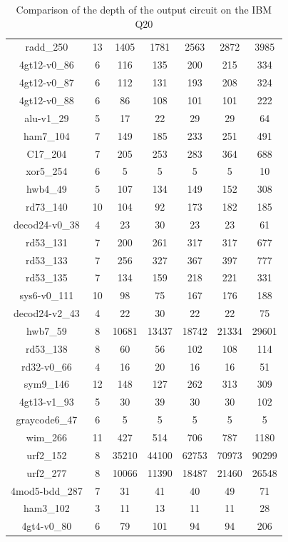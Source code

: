 \documentclass[runningheads]{llncs}
\begin{document}
\begin{table}[H]
\begin{center}
\begin{tabular}{|c|c|c|c|c|c|c|}
radd\_250 & 13 & 1405 & 1781 & 2563 & 2872 & 3985 \\
4gt12-v0\_86 & 6 & 116 & 135 & 200 & 215 & 334 \\
4gt12-v0\_87 & 6 & 112 & 131 & 193 & 208 & 324 \\
4gt12-v0\_88 & 6 & 86 & 108 & 101 & 101 & 222 \\
alu-v1\_29 & 5 & 17 & 22 & 29 & 29 & 64 \\
ham7\_104 & 7 & 149 & 185 & 233 & 251 & 491 \\
C17\_204 & 7 & 205 & 253 & 283 & 364 & 688 \\
xor5\_254 & 6 & 5 & 5 & 5 & 5 & 10 \\
hwb4\_49 & 5 & 107 & 134 & 149 & 152 & 308 \\
rd73\_140 & 10 & 104 & 92 & 173 & 182 & 185 \\
decod24-v0\_38 & 4 & 23 & 30 & 23 & 23 & 61 \\
rd53\_131 & 7 & 200 & 261 & 317 & 317 & 677 \\
rd53\_133 & 7 & 256 & 327 & 367 & 397 & 777 \\
rd53\_135 & 7 & 134 & 159 & 218 & 221 & 331 \\
sys6-v0\_111 & 10 & 98 & 75 & 167 & 176 & 188 \\
decod24-v2\_43 & 4 & 22 & 30 & 22 & 22 & 75 \\
hwb7\_59 & 8 & 10681 & 13437 & 18742 & 21334 & 29601 \\
rd53\_138 & 8 & 60 & 56 & 102 & 108 & 114 \\
rd32-v0\_66 & 4 & 16 & 20 & 16 & 16 & 51 \\
sym9\_146 & 12 & 148 & 127 & 262 & 313 & 309 \\
4gt13-v1\_93 & 5 & 30 & 39 & 30 & 30 & 102 \\
graycode6\_47 & 6 & 5 & 5 & 5 & 5 & 5 \\
wim\_266 & 11 & 427 & 514 & 706 & 787 & 1180 \\
urf2\_152 & 8 & 35210 & 44100 & 62753 & 70973 & 90299 \\
urf2\_277 & 8 & 10066 & 11390 & 18487 & 21460 & 26548 \\
4mod5-bdd\_287 & 7 & 31 & 41 & 40 & 49 & 71 \\
ham3\_102 & 3 & 11 & 13 & 11 & 11 & 28 \\
4gt4-v0\_80 & 6 & 79 & 101 & 94 & 94 & 206 \\
					\hline
						\end{tabular} 
						\end{center} 	
						\caption{Comparison of  the depth of the output circuit on the IBM Q20} 
						\label{tab6}
					\end{table}
\end{document}
